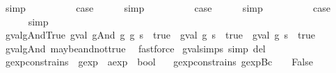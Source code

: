 \begin{isabellebody}
\ simp\isanewline
{}\isamarkupfalse%
\isanewline
\ \ \isamarkupfalse%
\ {\isachardoublequoteopen}{}{\isacharunderscore}{}{\isachardoublequoteclose}\isanewline
\ \ \isamarkupfalse%
\ \isamarkupfalse%
\ {\isacharquery}case\isanewline
\ \ \ \ \isamarkupfalse%
\ simp\isanewline
{}\isamarkupfalse%
\isanewline
\ \ \isamarkupfalse%
\ {\isachardoublequoteopen}{}{\isacharunderscore}{}{\isachardoublequoteclose}\isanewline
\ \ \isamarkupfalse%
\ \isamarkupfalse%
\ {\isacharquery}case\isanewline
\ \ \ \ \isamarkupfalse%
\ simp\isanewline
{}\isamarkupfalse%
\isanewline
\ \ \isamarkupfalse%
\ {}\isanewline
\ \ \isamarkupfalse%
\ \isamarkupfalse%
\ {\isacharquery}case\isanewline
\ \ \ \ \isamarkupfalse%
\ simp\isanewline
{}\isamarkupfalse%
%
\endisatagproof
{\isafoldproof}%
%
\isadelimproof
\isanewline
%
\endisadelimproof
\isanewline
{}\isamarkupfalse%
\ gval{\isacharunderscore}gAnd{\isacharunderscore}True{\isacharcolon}\ {\isachardoublequoteopen}{\isacharparenleft}gval\ {\isacharparenleft}gAnd\ g{}\ g{}{\isacharparenright}\ s\ {\isacharequal}\ true{\isacharparenright}\ {\isacharequal}\ {\isacharparenleft}{\isacharparenleft}gval\ g{}\ s\ {\isacharequal}\ true{\isacharparenright}\ {\isasymand}\ gval\ g{}\ s\ {\isacharequal}\ true{\isacharparenright}{\isachardoublequoteclose}\isanewline
%
\isadelimproof
\ \ %
\endisadelimproof
%
\isatagproof
{}\isamarkupfalse%
\ gval{\isacharunderscore}gAnd\ maybe{\isacharunderscore}and{\isacharunderscore}not{\isacharunderscore}true\ \isamarkupfalse%
\ fastforce%
\endisatagproof
{\isafoldproof}%
%
\isadelimproof
\isanewline
%
\endisadelimproof
\isanewline
{}\isamarkupfalse%
\ gval{\isachardot}simps\ {\isacharbrackleft}simp\ del{\isacharbrackright}\isanewline
\isanewline
{}\isamarkupfalse%
\ gexp{\isacharunderscore}constrains\ {\isacharcolon}{\isacharcolon}\ {\isachardoublequoteopen}gexp\ {\isasymRightarrow}\ aexp\ {\isasymRightarrow}\ bool{\isachardoublequoteclose}\ \isanewline
\ \ {\isachardoublequoteopen}gexp{\isacharunderscore}constrains\ {\isacharparenleft}gexp{\isachardot}Bc\ {\isacharunderscore}{\isacharparenright}\ {\isacharunderscore}\ {\isacharequal}\ False{\isachardoublequoteclose}\ {\isacharbar}\isanewline

\end{isabellebody}
